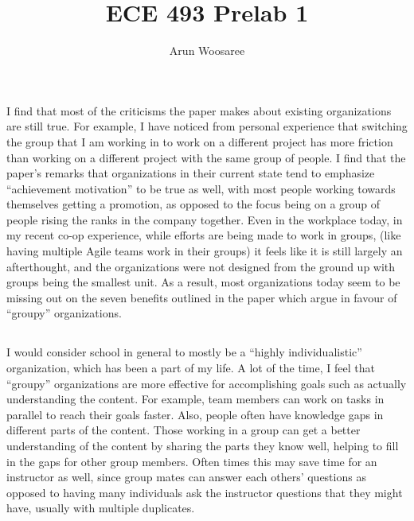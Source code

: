 \documentclass[letterpaper,12pt]{article}
\title{ECE 493 Prelab 1}
\author{Arun Woosaree\\
}
\begin{document}
\maketitle
\section{}
\subsection{}
I find that most of the criticisms the paper makes about existing
organizations are still true. For example, I have noticed from personal
experience that switching the group that I am working in to work on a
different project has more friction than working on a different project with
the same group of people. I find that the paper's remarks that organizations
in their current state tend to emphasize ``achievement motivation'' to be true
as well, with most people working towards themselves getting a promotion, as
opposed to the focus being on a group of people rising the ranks in the
company together.  Even in the workplace today, in my recent co-op
experience, while efforts are being made to work in groups, (like having
multiple Agile teams work in their groups) it feels like it is still largely
an afterthought, and the organizations were not designed from the ground up
with groups being the smallest unit. As a result, most organizations today
seem to be missing out on the seven benefits outlined in the paper which
argue in favour of ``groupy'' organizations.


\subsection{}
I would consider school in general to mostly be a ``highly individualistic''
organization, which has been a part of my life.  A lot of the time, I feel
that ``groupy'' organizations are more effective for accomplishing goals such
as actually understanding the content.  For example, team members can work on
tasks in parallel to reach their goals faster. Also, people often have
knowledge gaps in different parts of the content. Those working in a group
can get a better understanding of the content by sharing the parts they know
well, helping to fill in the gaps for other group members. Often times this
may save time for an instructor as well, since group mates can answer each
others' questions as opposed to having many individuals ask the instructor
questions that they might have, usually with multiple duplicates.
\end{document}
